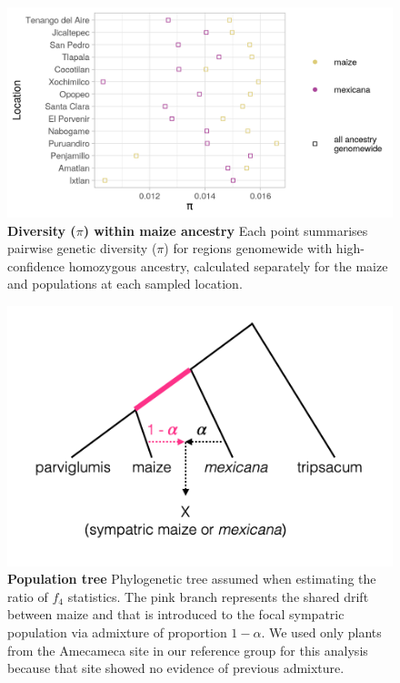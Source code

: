 \begin{figure}[ht]
\includegraphics[width=\textwidth]{chapter2/figures/pi_within_maize_ancestry.png}
\caption{\color{Gray} \textbf{Diversity ($\pi$) within maize ancestry} Each point summarises pairwise genetic diversity ($\pi$) for regions genomewide with high-confidence homozygous \mexicana ancestry, calculated separately for the maize and \mexicana populations at each sampled location.}
\label{pi_maize_ancestry}
\end{figure}

\begin{figure}[ht]
\includegraphics[width=\textwidth]{chapter2/figures/tree_f4_stats.png}
\caption{\color{Gray} \textbf{Population tree} Phylogenetic tree assumed when estimating the ratio of $f_4$ statistics. The pink branch represents the shared drift between maize and \parviglumis that is introduced to the focal sympatric population via admixture of proportion $1 - \alpha$. We used only plants from the Amecameca site in our \mexicana reference group for this analysis because that site showed no evidence of previous admixture.}
\label{f4_tree}
\end{figure}

